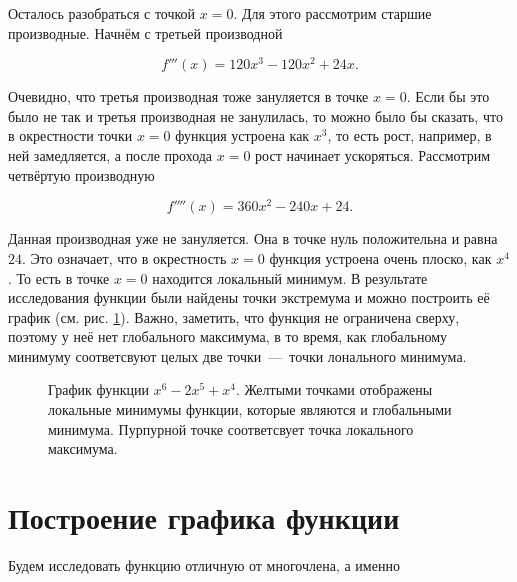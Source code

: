 \documentclass[12pt]{article}
\begin{document}
\par Осталось разобраться с точкой $x=0$. Для этого рассмотрим старшие производные. Начнём с третьей производной

\begin{equation}
	f'''(x) = 120 x^3 - 120x^2 + 24x.
\end{equation}

Очевидно, что третья производная тоже зануляется в точке $x=0$. Если бы это было не так и третья производная не занулилась, то можно было бы сказать, что в окрестности точки $x=0$ функция устроена как $x^3$, то есть рост, например, в ней замедляется, а после прохода $x=0$ рост начинает ускоряться. Рассмотрим четвёртую производную

\begin{equation}
	f''''(x) = 360x^2-240x+24.
\end{equation}

Данная производная уже не зануляется. Она в точке нуль положительна и равна $24$. Это означает, что в окрестность $x=0$ функция устроена очень плоско, как $x^4$. То есть в точке $x=0$ находится локальный минимум. В результате исследования функции были найдены точки экстремума и можно построить её график (см. рис. \ref{fig:74}). Важно, заметить, что функция не ограничена сверху, поэтому у неё нет глобального максимума, в то время, как глобальному минимуму соответсвуют целых две точки~\----~точки лонального минимума. 

\begin{figure}[htbp]
	\centering
	\caption{График функции $x^6-2x^5+x^4$. Желтыми точками отображены локальные минимумы функции, которые являются и глобальными минимума. Пурпурной точке соответсвует точка локального максимума.}
	\label{fig:74}
\end{figure}

\section{Построение графика функции} %
Будем исследовать функцию отличную от многочлена, а именно
\end{document}
